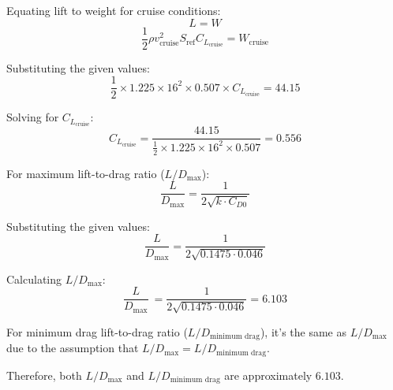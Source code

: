 \documentclass[12 pt]{article}
\begin{document}
Equating lift to weight for cruise conditions:
\[
L = W
\]
\[
\frac{1}{2} \rho v_{\text{cruise}}^2 S_{\text{ref}} C_{L_{\text{cruise}}} = W_{\text{cruise}}
\]

Substituting the given values:
\[
\frac{1}{2} \times 1.225 \times 16^2 \times 0.507 \times C_{L_{\text{cruise}}} = 44.15
\]

Solving for $C_{L_{\text{cruise}}}$:
\[
C_{L_{\text{cruise}}} = \frac{44.15}{\frac{1}{2} \times 1.225 \times 16^2 \times 0.507} = 0.556
\]

For maximum lift-to-drag ratio (\( L/D_{\text{max}} \)):
\[
\frac{L}{D_{\text{max}}} = \frac{1}{2\sqrt{k \cdot C_{D0}}}
\]

Substituting the given values:
\[
\frac{L}{D_{\text{max}}} = \frac{1}{2\sqrt{0.1475 \cdot 0.046}}
\]

Calculating \( L/D_{\text{max}} \):
\[
\frac{L}{D_{\text{max}}} \ =  \frac{1}{2\sqrt{0.1475 \cdot 0.046}} = 6.103
\]

For minimum drag lift-to-drag ratio (\( L/D_{\text{minimum drag}} \)), it's the same as \( L/D_{\text{max}} \) due to the assumption that \( L/D_{\text{max}} = L/D_{\text{minimum drag}} \).

Therefore, both \( L/D_{\text{max}} \) and \( L/D_{\text{minimum drag}} \) are approximately \(6.103\).
\end{document}
